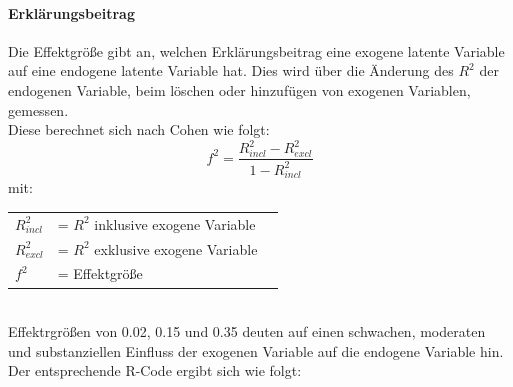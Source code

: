 \documentclass{article}\usepackage[]{graphicx}\usepackage[]{color}
\begin{document}
\paragraph{Erklärungsbeitrag}
Die Effektgröße gibt an, welchen Erklärungsbeitrag eine exogene latente Variable auf eine endogene latente Variable hat. Dies wird über die Änderung des $R^{2}$ der endogenen Variable, beim löschen oder hinzufügen von exogenen Variablen, gemessen.\\
Diese berechnet sich nach Cohen\cite{cohen1988statistical} wie folgt:
\begin{equation}
f^{2} = \frac{R^{2}_{incl}-R^{2}_{excl}}{1-R^{2}_{incl}}
\end{equation}
mit:\\
\begin{tabular}{lll}
$R^{2}_{incl}$ &= $R^{2}$ inklusive exogene Variable\\
$R^{2}_{excl}$ &= $R^{2}$ exklusive exogene Variable\\
$f^{2}$ &= Effektgröße
\end{tabular}
\\
Effektrgrößen von 0.02, 0.15 und 0.35 deuten auf einen schwachen, moderaten und substanziellen Einfluss der exogenen Variable auf die endogene Variable hin.\cite{cohen1988statistical,chin1998partial}\\
Der entsprechende R-Code ergibt sich wie folgt:
\end{document}
